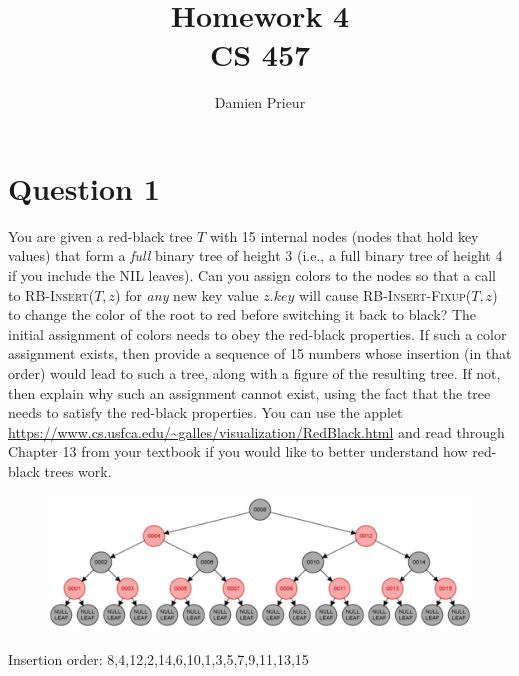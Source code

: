 \documentclass{article}
\author{Damien Prieur}
\title{Homework 4 \\ CS 457}
\date{}
\begin{document}
\maketitle

\section*{Question 1}
You are given a red-black tree $T$ with 15 internal nodes (nodes that hold key values)
that form a \emph{full} binary tree of height 3 (i.e., a full binary tree of height 4 if you include
the NIL leaves). Can you assign colors to the nodes so that a call to \textsc{RB-Insert}($T,z$) for
\emph{any} new key value $z.key$ will cause \textsc{RB-Insert-Fixup}($T,z$) to change the color of the
root to red before switching it back to black? The initial assignment of colors needs to obey the
red-black properties. If such a color assignment exists, then provide a sequence of 15 numbers whose
insertion (in that order) would lead to such a tree, along with a figure of the resulting tree. If not,
then explain why such an assignment cannot exist, using the fact that the tree needs to satisfy the
red-black properties. You can use the applet \url{https://www.cs.usfca.edu/~galles/visualization/RedBlack.html}
and read through Chapter 13 from your textbook if you would like to better understand how red-black trees work.

\begin{figure}[h]
    \includegraphics[width=\linewidth]{full_RB_tree.jpg}
\end{figure}

Insertion order:
8,4,12,2,14,6,10,1,3,5,7,9,11,13,15
\end{document}
